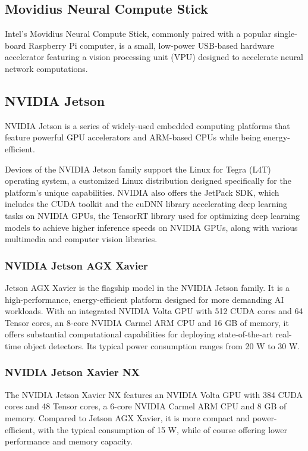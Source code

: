 \subsection{Movidius Neural Compute Stick}

Intel's Movidius Neural Compute Stick, commonly paired with a popular
single-board Raspberry Pi computer, is a small, low-power USB-based hardware
accelerator featuring a vision processing unit (VPU) designed to accelerate
neural network computations.


\subsection{NVIDIA Jetson}
\label{Jetsons}

NVIDIA Jetson is a series of widely-used embedded computing platforms that feature
powerful GPU accelerators and ARM-based CPUs while being energy-efficient.

Devices of the NVIDIA Jetson family support the Linux for Tegra (L4T) operating
system, a customized Linux distribution designed specifically for the platform's
unique capabilities. NVIDIA also offers the JetPack SDK, which includes the
CUDA toolkit and the cuDNN library accelerating deep learning tasks on NVIDIA
GPUs, the TensorRT library used for optimizing deep learning models to achieve
higher inference speeds on NVIDIA GPUs, along with various multimedia and
computer vision libraries.

\subsubsection{NVIDIA Jetson AGX Xavier}

Jetson AGX Xavier is the flagship model in the NVIDIA Jetson family. It is a
high-performance, energy-efficient platform designed for more demanding AI
workloads. With an integrated NVIDIA Volta GPU with 512 CUDA cores and 64 Tensor
cores, an 8-core NVIDIA Carmel ARM CPU and 16 GB of memory, it offers substantial
computational capabilities for deploying state-of-the-art real-time object
detectors. Its typical power consumption ranges from 20 W to 30 W.


\subsubsection{NVIDIA Jetson Xavier NX}

The NVIDIA Jetson Xavier NX features an NVIDIA Volta GPU with 384 CUDA cores and
48 Tensor cores, a 6-core NVIDIA Carmel ARM CPU and 8 GB of memory. Compared
to Jetson AGX Xavier, it is more compact and power-efficient, with the typical
consumption of 15 W, while of course offering lower performance and memory
capacity.


